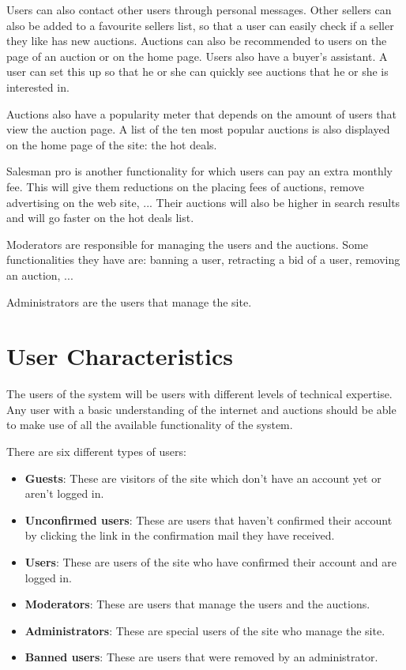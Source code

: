 	Users can also contact other users through personal messages. Other sellers can also
	be added to a favourite sellers list, so that a user can easily check if a 
	seller they like has new auctions. Auctions can also be recommended to users on the 
	page of an auction or on the home page. Users also have a buyer's assistant. A user
	can set this up so that he or she can quickly see auctions that he or she is interested
	in.
	
	Auctions also have a popularity meter that depends on the amount of users that view
	the auction page. A list of the ten most popular auctions is also displayed on the
	home page of the site: the hot deals.
	
	Salesman pro is another functionality for which users can pay an extra monthly fee. This
	will give them reductions on the placing fees of auctions, remove advertising on the
	web site, ... Their auctions will also be higher in search results and will go faster 
	on the hot deals list.
	
	Moderators are responsible for managing the users and the auctions. Some functionalities they have are: 
	banning a user, retracting a bid of a user, removing an auction, ... 
	
	Administrators are the users that manage the site. 
	
\section{User Characteristics}
	The users of the system will be users with different levels of 
	technical expertise. Any user with a basic understanding of the 
	internet and auctions should be able to make use of all the 
	available functionality of the system.
	
	There are six different types of users:
	
	\begin{itemize}
		\item \textbf{Guests}: These are visitors of the site which don't 
		have an account yet or aren't logged in.
		\item \textbf{Unconfirmed users}: These are users that haven't confirmed 
		their account by clicking the link in the confirmation mail they have received.
		\item \textbf{Users}: These are users of the site who have confirmed their 
		account and are logged in.
		\item \textbf{Moderators}: These are users that manage the users and the auctions.
		\item \textbf{Administrators}: These are special users of the 
		site who manage the site.
		\item \textbf{Banned users}: These are users that were removed by
		an administrator.
	\end{itemize}
	
